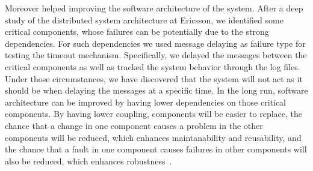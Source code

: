 Moreover \approach{} helped improving the software architecture of the system. 
After a deep study of the distributed system architecture at Ericsson, we identified some critical components, whose failures can be potentially due to the strong dependencies. For such dependencies we used message delaying as failure type for testing the timeout mechanism. %
Specifically, we delayed the messages between the critical components as well as tracked the system behavior through the log files. Under those circumstances, we have discovered that the system will not act as it should be when delaying the messages at a specific time. In the long run, software architecture can be improved by having lower dependencies on those critical components. By having lower coupling, components will be easier to replace, the chance that a change in one component causes a problem in the other components will be reduced, which enhances maintanability and reusability, and the chance that a fault in one component causes failures in other components will also be reduced, which  enhances robustness~\cite{software_arch}.  


